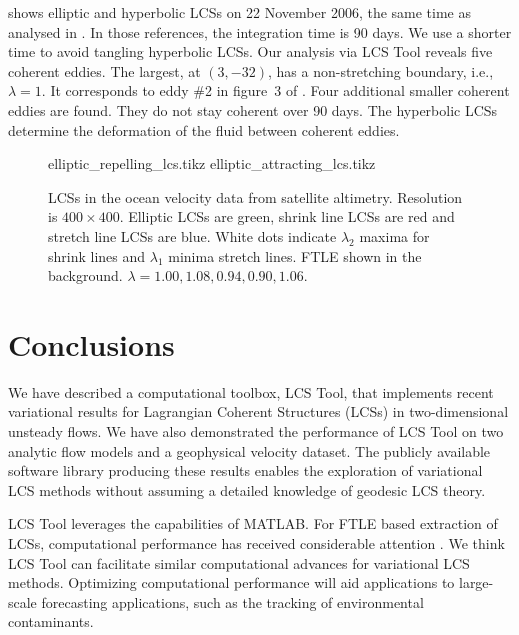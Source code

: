 \documentclass[5p]{elsarticle}
\newlength\figurewidth
\begin{document}
\begin{sloppypar}
 shows elliptic and hyperbolic LCSs on 22 November 2006, the same time as analysed in \citet{haller13:_coher_lagran,haller14:_adden_coher_lagran,beron-vera13:_objec_agulh}.
In those references, the integration time is 90 days.
We use a shorter time to avoid tangling hyperbolic LCSs.
Our analysis via LCS Tool reveals five coherent eddies.
The largest, at $(3,-32)$, has a non-stretching boundary, i.e., $\lambda = 1$.
It corresponds to eddy \#2 in figure~3 of \citet{beron-vera13:_objec_agulh}.
Four additional smaller coherent eddies are found.
They do not stay coherent over 90 days.
The hyperbolic LCSs determine the deformation of the fluid between coherent eddies.
\end{sloppypar}

\begin{figure}
\begin{center}
\setlength{}
{elliptic_repelling_lcs.tikz}
{elliptic_attracting_lcs.tikz}
\end{center}
\caption{
LCSs in the ocean velocity data from satellite altimetry.
Resolution is $400 \times 400$.
Elliptic LCSs are green, shrink line LCSs are red and stretch line LCSs are blue.
White dots indicate $\lambda_2$ maxima for shrink lines and $\lambda_1$ minima stretch lines.
FTLE shown in the background.
$\lambda = 1.00, 1.08, 0.94, 0.90, 1.06$.
}
\label{f:ocean dataset LCS}
\end{figure}

\section{Conclusions}

We have described a computational toolbox, LCS Tool, that implements recent variational results for Lagrangian Coherent Structures (LCSs) in two-dimensional unsteady flows. We have also demonstrated the performance of LCS Tool on two analytic flow models and a geophysical velocity dataset. The publicly available software library producing these results enables the exploration of variational LCS methods without assuming a detailed knowledge of geodesic LCS theory.

LCS Tool leverages the capabilities of MATLAB. For FTLE based extraction of LCSs, computational performance has received considerable attention \citep{conti12:_gpu_apu_finit_time_lyapun_expon,miron12:_anisot_lagran_coher_struc}.
We think LCS Tool can facilitate similar computational advances for variational LCS methods.
Optimizing computational performance will aid applications to large-scale forecasting applications, such as the tracking of environmental contaminants\citep{olascoaga12:_forec}.
\end{document}
